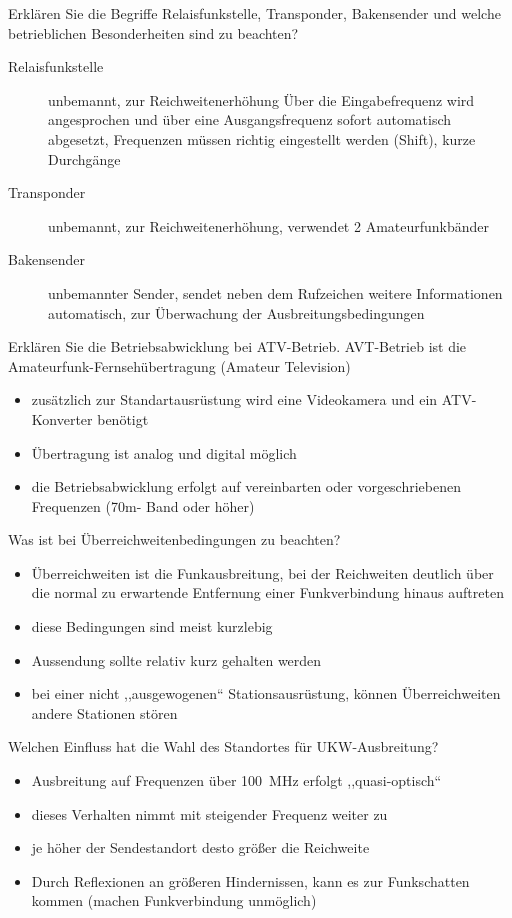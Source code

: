\documentclass[avery5371,grid,frame,a4paper]{flashcards}
\newcommand{\card}[3]{
  \begin{flashcard}[{\chap} -- #1]{#2}#3\end{flashcard}
}
\begin{document}
\card{63}{Erklären Sie die Begriffe Relaisfunkstelle, Transponder, Bakensender und welche betrieblichen Besonderheiten sind zu beachten?}{
  \small
  \begin{description}
    \item[Relaisfunkstelle] unbemannt, zur Reichweitenerhöhung
      Über die Eingabefrequenz wird angesprochen und über eine Ausgangsfrequenz sofort automatisch abgesetzt, Frequenzen müssen richtig eingestellt werden (Shift), kurze Durchgänge
    \item[Transponder] unbemannt, zur Reichweitenerhöhung, verwendet 2 Amateurfunkbänder
    \item[Bakensender] unbemannter Sender, sendet neben dem Rufzeichen weitere Informationen automatisch, zur Überwachung der Ausbreitungsbedingungen
  \end{description}
}
\card{64}{Erklären Sie die Betriebsabwicklung bei ATV-Betrieb.}{
  AVT-Betrieb ist die Amateurfunk-Fernsehübertragung (Amateur Television)
  \begin{itemize}
    \item zusätzlich zur Standartausrüstung wird eine Videokamera und ein ATV-Konverter benötigt
    \item Übertragung ist analog und digital möglich
    \item die Betriebsabwicklung erfolgt auf vereinbarten oder vorgeschriebenen Frequenzen (70m- Band oder höher)
  \end{itemize}
}
\card{65}{Was ist bei Überreichweitenbedingungen zu beachten?}{
  \small
  \begin{itemize}
    \item Überreichweiten ist die Funkausbreitung, bei der Reichweiten deutlich über die normal zu erwartende Entfernung einer Funkverbindung hinaus auftreten
    \item diese Bedingungen sind meist kurzlebig
    \item Aussendung sollte relativ kurz gehalten werden
    \item bei einer nicht ,,ausgewogenen`` Stationsausrüstung, können Überreichweiten andere Stationen stören
  \end{itemize}
}
\card{66}{Welchen Einfluss hat die Wahl des Standortes für UKW-Ausbreitung?}{
  \begin{itemize}\itemsep0pt
    \item Ausbreitung auf Frequenzen über 100~MHz erfolgt ,,quasi-optisch``
    \item dieses Verhalten nimmt mit steigender Frequenz weiter zu
    \item je höher der Sendestandort desto größer die Reichweite
    \item Durch Reflexionen an größeren Hindernissen, kann es zur Funkschatten kommen (machen Funkverbindung unmöglich)
  \end{itemize}
}
\end{document}

